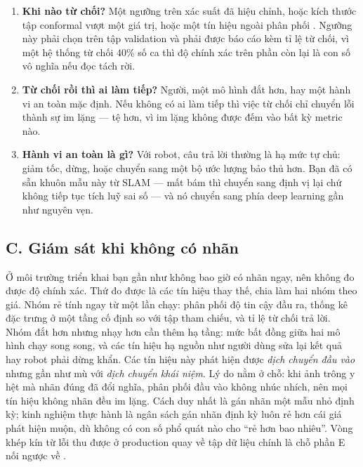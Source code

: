 \documentclass[../../deep_learning.tex]{subfiles}
\begin{document}
\begin{enumerate}
\item \textbf{Khi nào từ chối?} Một ngưỡng trên xác suất đã hiệu chỉnh, hoặc kích thước tập conformal vượt một giá trị, hoặc một tín hiệu ngoài phân phối \cite{hendrycks2017baseline}. Ngưỡng này phải chọn trên tập validation và phải được báo cáo kèm tỉ lệ từ chối, vì một hệ thống từ chối 40\% số ca thì độ chính xác trên phần còn lại là con số vô nghĩa nếu đọc tách rời.
\item \textbf{Từ chối rồi thì ai làm tiếp?} Người, một mô hình đắt hơn, hay một hành vi an toàn mặc định. Nếu không có ai làm tiếp thì việc từ chối chỉ chuyển lỗi thành sự im lặng --- tệ hơn, vì im lặng không được đếm vào bất kỳ metric nào.
\item \textbf{Hành vi an toàn là gì?} Với robot, câu trả lời thường là hạ mức tự chủ: giảm tốc, dừng, hoặc chuyển sang một bộ ước lượng bảo thủ hơn. Bạn đã có sẵn khuôn mẫu này từ SLAM --- mất bám thì chuyển sang định vị lại chứ không tiếp tục tích luỹ sai số --- và nó chuyển sang phía deep learning gần như nguyên vẹn.
\end{enumerate}

\subsection{C. Giám sát khi không có nhãn}
Ở môi trường triển khai bạn gần như không bao giờ có nhãn ngay, nên không đo được độ chính xác. Thứ đo được là các tín hiệu thay thế, chia làm hai nhóm theo giá. Nhóm rẻ tính ngay từ một lần chạy: phân phối độ tin cậy đầu ra, thống kê đặc trưng ở một tầng cố định so với tập tham chiếu, và tỉ lệ từ chối trả lời. Nhóm đắt hơn nhưng nhạy hơn cần thêm hạ tầng: mức bất đồng giữa hai mô hình chạy song song, và các tín hiệu hạ nguồn như người dùng sửa lại kết quả hay robot phải dừng khẩn. Các tín hiệu này phát hiện được \emph{dịch chuyển đầu vào} nhưng gần như mù với \emph{dịch chuyển khái niệm}. Lý do nằm ở chỗ: khi ảnh trông y hệt mà nhãn đúng đã đổi nghĩa, phân phối đầu vào không nhúc nhích, nên mọi tín hiệu không nhãn đều im lặng. Cách duy nhất là gán nhãn một mẫu nhỏ định kỳ; kinh nghiệm thực hành là ngân sách gán nhãn định kỳ luôn rẻ hơn cái giá phát hiện muộn, dù không có con số phổ quát nào cho ``rẻ hơn bao nhiêu''. Vòng khép kín từ lỗi thu được ở production quay về tập dữ liệu chính là chỗ phần E nối ngược về .
\end{document}
